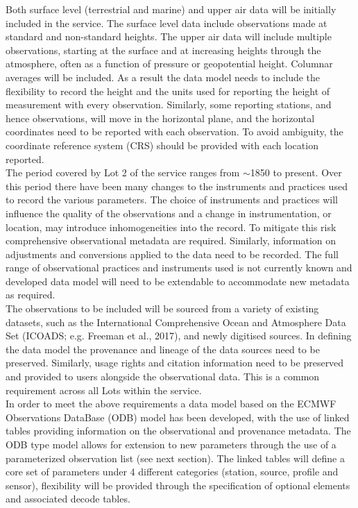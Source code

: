\documentclass[a4paper,12pt]{article}
\begin{document}
Both surface level (terrestrial and marine) and upper air data will be initially included in the service. The surface level data include observations made at standard and non-standard heights. The upper air data will include multiple observations, starting at the surface and at increasing heights through the atmosphere, often as a function of pressure or geopotential height. Columnar averages will be included. As a result the data model needs to include the flexibility to record the height and the units used for reporting the height of measurement with every observation. Similarly, some reporting stations, and hence observations, will move in the horizontal plane, and the horizontal coordinates need to be reported with each observation. To avoid ambiguity, the coordinate reference system (CRS) should be provided with each location reported.\\

The period covered by Lot 2 of the service ranges from $\sim$1850 to present. Over this period there have been many changes to the instruments and practices used to record the various parameters. The choice of instruments and practices will influence the quality of the observations and a change in instrumentation, or location, may introduce inhomogeneities into the record. To mitigate this risk comprehensive observational metadata are required. Similarly, information on adjustments and conversions applied to the data need to be recorded. The full range of observational practices and instruments used is not currently known and developed data model will need to be extendable to accommodate new metadata as required.\\

The observations to be included will be sourced from a variety of existing datasets, such as the International Comprehensive Ocean and Atmosphere Data Set (ICOADS; e.g. Freeman et al., 2017), and newly digitised sources. In defining the data model the provenance and lineage of the data sources need to be preserved. Similarly, usage rights and citation information need to be preserved and provided to users alongside the observational data. This is a common requirement across all Lots within the service.\\

In order to meet the above requirements a data model based on the ECMWF Observations DataBase (ODB) model has been developed, with the use of linked tables providing information on the observational and provenance metadata. The ODB type model allows for extension to new parameters through the use of a parameterized observation list (see next section). The linked tables will define a core set of parameters under 4 different categories (station, source, profile and sensor), flexibility will be provided through the specification of optional elements and associated decode tables.\\
\end{document}
